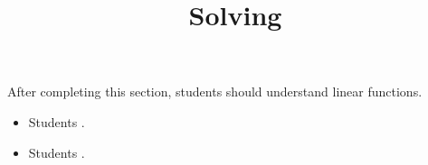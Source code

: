 \documentclass{ximera}
\title{Solving}
\begin{document}
\begin{abstract}
\end{abstract}

\maketitle

\begin{sectionOutcomes}

After completing this section, students should understand linear functions. 

\begin{itemize}
\item Students .
\item Students .
\end{itemize}

\end{sectionOutcomes}
\end{document}
